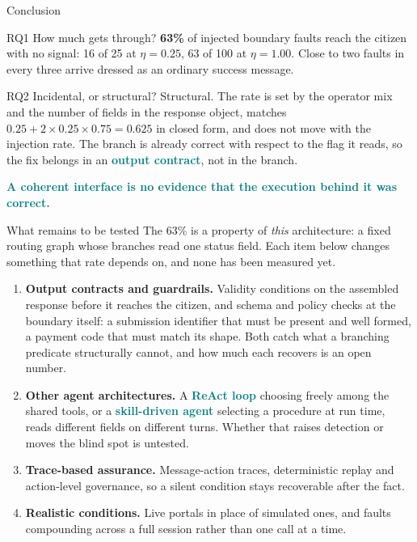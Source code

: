 \documentclass[aspectratio=169,10pt]{beamer}
\newcommand{\hl}[1]{\textcolor{teal}{\textbf{#1}}}      %
\newcommand{\risk}[1]{\textcolor{rust}{\textbf{#1}}}    %
\begin{document}
\begin{frame}{Conclusion}
  \begin{block}{RQ1 \quad How much gets through?}
    \small \risk{63\%} of injected boundary faults reach the citizen with no signal: 16 of 25 at
    $\eta = 0.25$, 63 of 100 at $\eta = 1.00$. Close to two faults in every three arrive dressed
    as an ordinary success message.
  \end{block}
  \begin{block}{RQ2 \quad Incidental, or structural?}
    \small Structural. The rate is set by the operator mix and the number of fields in the
    response object, matches $0.25 + 2 \times 0.25 \times 0.75 = 0.625$ in closed form, and does
    not move with the injection rate. The branch is already correct with respect to the flag it
    reads, so the fix belongs in an \hl{output contract}, not in the branch.
  \end{block}
  \vfill
  \centering
  \hl{A coherent interface is no evidence that the execution behind it was correct.}
\end{frame}

\begin{frame}{What remains to be tested}
  \small
  The 63\% is a property of \emph{this} architecture: a fixed routing graph whose branches read
  one status field. Each item below changes something that rate depends on, and none has been
  measured yet.
  \vfill
  \begin{enumerate}\small
    \item \textbf{Output contracts and guardrails.} Validity conditions on the assembled
      response before it reaches the citizen, and schema and policy checks at the boundary
      itself: a submission identifier that must be present and well formed, a payment code that
      must match its shape. Both catch what a branching predicate structurally cannot, and how
      much each recovers is an open number.
    \item \textbf{Other agent architectures.} A \hl{ReAct loop} choosing freely among the shared
      tools, or a \hl{skill-driven agent} selecting a procedure at run time, reads different
      fields on different turns. Whether that raises detection or moves the blind spot is
      untested.
    \item \textbf{Trace-based assurance.} Message-action traces, deterministic replay and
      action-level governance, so a silent condition stays recoverable after the fact.
    \item \textbf{Realistic conditions.} Live portals in place of simulated ones, and faults
      compounding across a full session rather than one call at a time.
  \end{enumerate}
\end{frame}
\end{document}
